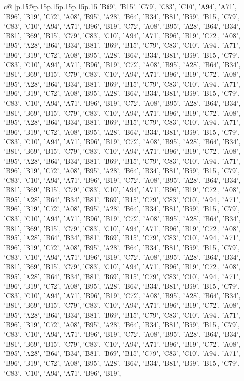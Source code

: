 \documentclass{article}
\begin{document}
{\begin{supertabular}{c@{$\;$}|p{.15\linewidth}@{}p{.15\linewidth}p{.15\linewidth}p{.15\linewidth}p{.15\linewidth}p{.15\linewidth}}
{{{'B69', 'B15', 'C79', 'C83', 'C10', 'A94', 'A71', 'B96', 'B19', 'C72', 'A08', 'B95', 'A28', 'B64', 'B34', 'B81', 'B69', 'B15', 'C79', 'C83', 'C10', 'A94', 'A71', 'B96', 'B19', 'C72', 'A08', 'B95', 'A28', 'B64', 'B34', 'B81', 'B69', 'B15', 'C79', 'C83', 'C10', 'A94', 'A71', 'B96', 'B19', 'C72', 'A08', 'B95', 'A28', 'B64', 'B34', 'B81', 'B69', 'B15', 'C79', 'C83', 'C10', 'A94', 'A71', 'B96', 'B19', 'C72', 'A08', 'B95', 'A28', 'B64', 'B34', 'B81', 'B69', 'B15', 'C79', 'C83', 'C10', 'A94', 'A71', 'B96', 'B19', 'C72', 'A08', 'B95', 'A28', 'B64', 'B34', 'B81', 'B69', 'B15', 'C79', 'C83', 'C10', 'A94', 'A71', 'B96', 'B19', 'C72', 'A08', 'B95', 'A28', 'B64', 'B34', 'B81', 'B69', 'B15', 'C79', 'C83', 'C10', 'A94', 'A71', 'B96', 'B19', 'C72', 'A08', 'B95', 'A28', 'B64', 'B34', 'B81', 'B69', 'B15', 'C79', 'C83', 'C10', 'A94', 'A71', 'B96', 'B19', 'C72', 'A08', 'B95', 'A28', 'B64', 'B34', 'B81', 'B69', 'B15', 'C79', 'C83', 'C10', 'A94', 'A71', 'B96', 'B19', 'C72', 'A08', 'B95', 'A28', 'B64', 'B34', 'B81', 'B69', 'B15', 'C79', 'C83', 'C10', 'A94', 'A71', 'B96', 'B19', 'C72', 'A08', 'B95', 'A28', 'B64', 'B34', 'B81', 'B69', 'B15', 'C79', 'C83', 'C10', 'A94', 'A71', 'B96', 'B19', 'C72', 'A08', 'B95', 'A28', 'B64', 'B34', 'B81', 'B69', 'B15', 'C79', 'C83', 'C10', 'A94', 'A71', 'B96', 'B19', 'C72', 'A08', 'B95', 'A28', 'B64', 'B34', 'B81', 'B69', 'B15', 'C79', 'C83', 'C10', 'A94', 'A71', 'B96', 'B19', 'C72', 'A08', 'B95', 'A28', 'B64', 'B34', 'B81', 'B69', 'B15', 'C79', 'C83', 'C10', 'A94', 'A71', 'B96', 'B19', 'C72', 'A08', 'B95', 'A28', 'B64', 'B34', 'B81', 'B69', 'B15', 'C79', 'C83', 'C10', 'A94', 'A71', 'B96', 'B19', 'C72', 'A08', 'B95', 'A28', 'B64', 'B34', 'B81', 'B69', 'B15', 'C79', 'C83', 'C10', 'A94', 'A71', 'B96', 'B19', 'C72', 'A08', 'B95', 'A28', 'B64', 'B34', 'B81', 'B69', 'B15', 'C79', 'C83', 'C10', 'A94', 'A71', 'B96', 'B19', 'C72', 'A08', 'B95', 'A28', 'B64', 'B34', 'B81', 'B69', 'B15', 'C79', 'C83', 'C10', 'A94', 'A71', 'B96', 'B19', 'C72', 'A08', 'B95', 'A28', 'B64', 'B34', 'B81', 'B69', 'B15', 'C79', 'C83', 'C10', 'A94', 'A71', 'B96', 'B19', 'C72', 'A08', 'B95', 'A28', 'B64', 'B34', 'B81', 'B69', 'B15', 'C79', 'C83', 'C10', 'A94', 'A71', 'B96', 'B19', 'C72', 'A08', 'B95', 'A28', 'B64', 'B34', 'B81', 'B69', 'B15', 'C79', 'C83', 'C10', 'A94', 'A71', 'B96', 'B19', 'C72', 'A08', 'B95', 'A28', 'B64', 'B34', 'B81', 'B69', 'B15', 'C79', 'C83', 'C10', 'A94', 'A71', 'B96', 'B19', 'C72', 'A08', 'B95', 'A28', 'B64', 'B34', 'B81', 'B69', 'B15', 'C79', 'C83', 'C10', 'A94', 'A71', 'B96', 'B19', 'C72', 'A08', 'B95', 'A28', 'B64', 'B34', 'B81', 'B69', 'B15', 'C79', 'C83', 'C10', 'A94', 'A71', 'B96', 'B19', 'C72', 'A08', 'B95', 'A28', 'B64', 'B34', 'B81', 'B69', 'B15', 'C79', 'C83', 'C10', 'A94', 'A71', 'B96', 'B19', 'C72', 'A08', 'B95', 'A28', 'B64', 'B34', 'B81', 'B69', 'B15', 'C79', 'C83', 'C10', 'A94', 'A71', 'B96', 'B19', 'C72', 'A08', 'B95', 'A28', 'B64', 'B34', 'B81', 'B69', 'B15', 'C79', 'C83', 'C10', 'A94', 'A71', 'B96', 'B19', 'C72', 'A08', 'B95', 'A28', 'B64', 'B34', 'B81', 'B69', 'B15', 'C79', 'C83', 'C10', 'A94', 'A71', 'B96', 'B19', 'C72', 'A08', 'B95', 'A28', 'B64', 'B34', 'B81', 'B69', 'B15', 'C79', 'C83', 'C10', 'A94', 'A71', 'B96', 'B19', }}}
\end{supertabular}}
\end{document}
